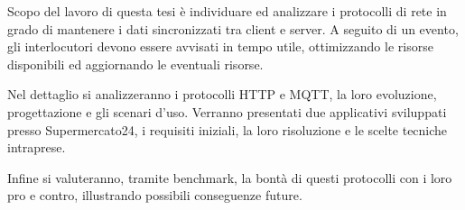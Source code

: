 Scopo del lavoro di questa tesi è individuare ed analizzare i protocolli di rete in grado di mantenere i dati sincronizzati tra client e server.
A seguito di un evento, gli interlocutori devono essere avvisati in tempo utile, ottimizzando le risorse disponibili ed aggiornando le eventuali risorse.

Nel dettaglio si analizzeranno i protocolli HTTP e MQTT, la loro evoluzione, progettazione e gli scenari d'uso.
Verranno presentati due applicativi sviluppati presso Supermercato24, i requisiti iniziali, la loro risoluzione e le scelte tecniche intraprese.

Infine si valuteranno, tramite benchmark, la bontà di questi protocolli con i loro pro e contro, illustrando possibili conseguenze future.
